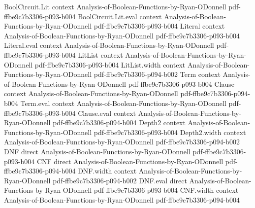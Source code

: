 \begin{lemma}
\leanok
{}
\proofstep
  {BoolCircuit.Lit}
  {context}
  {Analysis-of-Boolean-Functions-by-Ryan-ODonnell}
  {pdf-ffbe9c7b3306-p093-b004}
\proofstep
  {BoolCircuit.Lit.eval}
  {context}
  {Analysis-of-Boolean-Functions-by-Ryan-ODonnell}
  {pdf-ffbe9c7b3306-p093-b004}
\proofstep
  {Literal}
  {context}
  {Analysis-of-Boolean-Functions-by-Ryan-ODonnell}
  {pdf-ffbe9c7b3306-p093-b004}
\proofstep
  {Literal.eval}
  {context}
  {Analysis-of-Boolean-Functions-by-Ryan-ODonnell}
  {pdf-ffbe9c7b3306-p093-b004}
\proofstep
  {LitList}
  {context}
  {Analysis-of-Boolean-Functions-by-Ryan-ODonnell}
  {pdf-ffbe9c7b3306-p093-b004}
\proofstep
  {LitList.width}
  {context}
  {Analysis-of-Boolean-Functions-by-Ryan-ODonnell}
  {pdf-ffbe9c7b3306-p094-b002}
\proofstep
  {Term}
  {context}
  {Analysis-of-Boolean-Functions-by-Ryan-ODonnell}
  {pdf-ffbe9c7b3306-p093-b004}
\proofstep
  {Clause}
  {context}
  {Analysis-of-Boolean-Functions-by-Ryan-ODonnell}
  {pdf-ffbe9c7b3306-p094-b004}
\proofstep
  {Term.eval}
  {context}
  {Analysis-of-Boolean-Functions-by-Ryan-ODonnell}
  {pdf-ffbe9c7b3306-p093-b004}
\proofstep
  {Clause.eval}
  {context}
  {Analysis-of-Boolean-Functions-by-Ryan-ODonnell}
  {pdf-ffbe9c7b3306-p094-b004}
\proofstep
  {Depth2}
  {context}
  {Analysis-of-Boolean-Functions-by-Ryan-ODonnell}
  {pdf-ffbe9c7b3306-p093-b004}
\proofstep
  {Depth2.width}
  {context}
  {Analysis-of-Boolean-Functions-by-Ryan-ODonnell}
  {pdf-ffbe9c7b3306-p094-b002}
\proofstep
  {DNF}
  {direct}
  {Analysis-of-Boolean-Functions-by-Ryan-ODonnell}
  {pdf-ffbe9c7b3306-p093-b004}
\proofstep
  {CNF}
  {direct}
  {Analysis-of-Boolean-Functions-by-Ryan-ODonnell}
  {pdf-ffbe9c7b3306-p094-b004}
\proofstep
  {DNF.width}
  {context}
  {Analysis-of-Boolean-Functions-by-Ryan-ODonnell}
  {pdf-ffbe9c7b3306-p094-b002}
\proofstep
  {DNF.eval}
  {direct}
  {Analysis-of-Boolean-Functions-by-Ryan-ODonnell}
  {pdf-ffbe9c7b3306-p093-b004}
\proofstep
  {CNF.width}
  {context}
  {Analysis-of-Boolean-Functions-by-Ryan-ODonnell}
  {pdf-ffbe9c7b3306-p094-b004}

\end{lemma}
